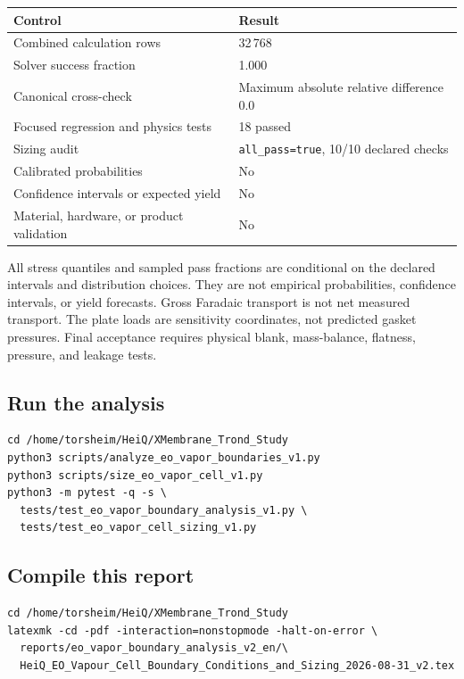 \documentclass[10pt,a4paper]{article}
\begin{document}
\begin{tabularx}{\textwidth}{@{}p{50mm}Y@{}}
\toprule
\textbf{Control} & \textbf{Result} \\
\midrule
Combined calculation rows & 32\,768 \\
Solver success fraction & 1.000 \\
Canonical cross-check & Maximum absolute relative difference 0.0 \\
Focused regression and physics tests & 18 passed \\
Sizing audit & \texttt{all\_pass=true}, 10/10 declared checks \\
Calibrated probabilities & No \\
Confidence intervals or expected yield & No \\
Material, hardware, or product validation & No \\
\bottomrule
\end{tabularx}

\begin{stopbox}
All stress quantiles and sampled pass fractions are conditional on the
declared intervals and distribution choices. They are not empirical
probabilities, confidence intervals, or yield forecasts. Gross Faradaic
transport is not net measured transport. The plate loads are sensitivity
coordinates, not predicted gasket pressures. Final acceptance requires
physical blank, mass-balance, flatness, pressure, and leakage tests.
\end{stopbox}

\subsection{Run the analysis}

\begin{verbatim}
cd /home/torsheim/HeiQ/XMembrane_Trond_Study
python3 scripts/analyze_eo_vapor_boundaries_v1.py
python3 scripts/size_eo_vapor_cell_v1.py
python3 -m pytest -q -s \
  tests/test_eo_vapor_boundary_analysis_v1.py \
  tests/test_eo_vapor_cell_sizing_v1.py
\end{verbatim}

\subsection{Compile this report}

\begingroup
\footnotesize
\begin{verbatim}
cd /home/torsheim/HeiQ/XMembrane_Trond_Study
latexmk -cd -pdf -interaction=nonstopmode -halt-on-error \
  reports/eo_vapor_boundary_analysis_v2_en/\
  HeiQ_EO_Vapour_Cell_Boundary_Conditions_and_Sizing_2026-08-31_v2.tex
\end{verbatim}
\endgroup
\end{document}

